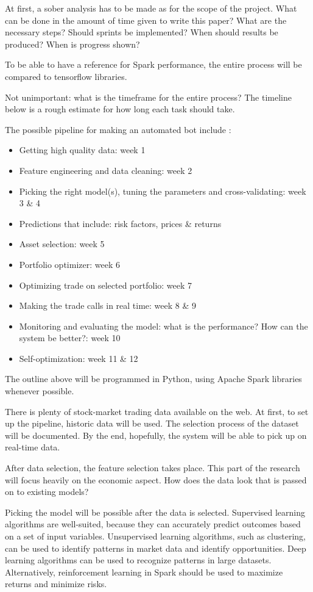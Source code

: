 At first, a sober analysis has to be made as for the scope of the project. What can be done in the amount of time given to write this paper? What are the necessary steps? Should sprints be implemented? When should results be produced? When is progress shown?

To be able to have a reference for Spark performance, the entire process will be compared to tensorflow libraries.

Not unimportant: what is the timeframe for the entire process? The timeline below is a rough estimate for how long each task should take. 

The possible pipeline for making an automated bot include \autocite{Zhang_2022}:
\begin{itemize}
    \item Getting high quality data: week 1
    \item Feature engineering and data cleaning: week 2
    \item Picking the right model(s), tuning the parameters and cross-validating: week 3 \& 4
    \item Predictions that include: risk factors, prices \& returns
    \item Asset selection: week 5
    \item Portfolio optimizer: week 6
    \item Optimizing trade on selected portfolio: week 7
    \item Making the trade calls in real time: week 8 \& 9
    \item Monitoring and evaluating the model: what is the performance? How can the system be better?: week 10
    \item Self-optimization: week 11 \& 12
\end{itemize}

The outline above will be programmed in Python, using Apache Spark libraries whenever possible.

There is plenty of stock-market trading data available on the web. At first, to set up the pipeline, historic data will be used. The selection process of the dataset will be documented. By the end, hopefully, the system will be able to pick up on real-time data.

After data selection, the feature selection takes place. This part of the research will focus heavily on the economic aspect. How does the data look that is passed on to existing models? 

Picking the model will be possible after the data is selected. Supervised learning algorithms are well-suited, because they can accurately predict outcomes based on a set of input variables. Unsupervised learning algorithms, such as clustering, can be used to identify patterns in market data and identify opportunities. Deep learning algorithms can be used to recognize patterns in large datasets. Alternatively, reinforcement learning in Spark should be used to maximize returns and minimize risks. \textcite{Azhikodan_2018} \textcite{Huang_2022}

